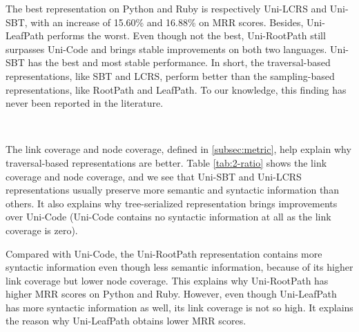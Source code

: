 \documentclass[conference]{IEEEtran}
\begin{document}
The best representation on Python and Ruby is respectively Uni-LCRS and Uni-SBT, with an increase of 15.60\% and 16.88\% on MRR scores. Besides, Uni-LeafPath performs the worst. Even though not the best, Uni-RootPath still surpasses Uni-Code and brings stable improvements on both two languages. Uni-SBT has the best and most stable performance. In short, the traversal-based representations, like SBT and LCRS, perform better than the sampling-based representations, like RootPath and LeafPath. To our knowledge, this finding has never been reported in the literature.

\begin{table}[thb]
\centering
\caption{Coverage Ratios of Unimodal Representations}
~\\
\label{tab:2-ratio}
\end{table}
 
The link coverage and node coverage, defined in \autoref{subsec:metric}, help explain why traversal-based representations are better. Table \ref{tab:2-ratio} shows the link coverage and node coverage, and we see that Uni-SBT and Uni-LCRS representations usually preserve more semantic and syntactic information than others. It also explains why tree-serialized representation brings improvements over Uni-Code (Uni-Code contains no syntactic information at all as the link coverage is zero).

Compared with Uni-Code, the Uni-RootPath representation contains more syntactic information even though less semantic information, because of its higher link coverage but lower node coverage. This explains why Uni-RootPath has higher MRR scores on Python and Ruby. However, even though Uni-LeafPath has more syntactic information as well, its link coverage is not so high. It explains the reason why Uni-LeafPath obtains lower MRR scores.
\end{document}

